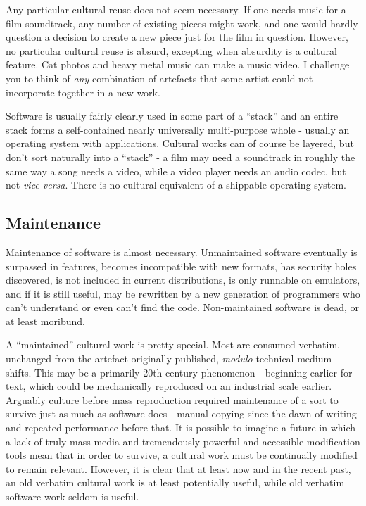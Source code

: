 Any particular cultural reuse does not seem necessary. If one needs music for a
f\hbox{}ilm soundtrack, any number of existing pieces might work, and one would
hardly question a decision to create a new piece just for the f\hbox{}ilm in
question.  However, no particular cultural reuse is absurd, excepting when
absurdity is a cultural feature. Cat photos and heavy metal music can make a
music video. I challenge you to think of \textit{any} combination of artefacts
that some artist could not incorporate together in a new work.

Software is usually fairly clearly used in some part of a ``stack'' and an
entire stack forms a self-contained nearly universally multi-purpose whole -
usually an operating system with applications. Cultural works can of course be
layered, but don't sort naturally into a ``stack'' - a f\hbox{}ilm may need a
soundtrack in roughly the same way a song needs a video, while a video player
needs an audio codec, but not \textit{vice versa}. There is no cultural
equivalent of a shippable operating system.


\subsection{Maintenance}
\label{ss:free_culture_software_freedom:obvious_software:maintenance}

Maintenance of software is almost necessary. Unmaintained software eventually is
surpassed in features, becomes incompatible with new formats, has security holes
discovered, is not included in current distributions, is only runnable on
emulators, and if it is still useful, may be rewritten by a new generation of
programmers who can't understand or even can't f\hbox{}ind the code.
Non-maintained software is dead, or at least moribund.

A ``maintained'' cultural work is pretty special. Most are consumed verbatim,
unchanged from the artefact originally published, \textit{modulo} technical
medium shifts. This may be a primarily 20th century phenomenon - beginning
earlier for text, which could be mechanically reproduced on an industrial scale
earlier.  Arguably culture before mass reproduction required maintenance of a
sort to survive just as much as software does - manual copying since the dawn of
writing and repeated performance before that. It is possible to imagine a future
in which a lack of truly mass media and tremendously powerful and accessible
modif\hbox{}ication tools mean that in order to survive, a cultural work must be
continually modif\hbox{}ied to remain relevant. However, it is clear that at
least now and in the recent past, an old verbatim cultural work is at least
potentially useful, while old verbatim software work seldom is useful.


